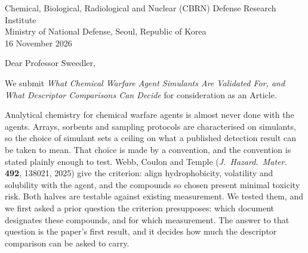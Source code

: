 \documentclass[11pt,a4paper]{article}
\begin{document}
{\small
Chemical, Biological, Radiological and Nuclear (CBRN) Defense Research Institute\\
Ministry of National Defense, Seoul, Republic of Korea\\
16 November 2026}

\vspace{6pt}

Dear Professor Sweedler,

We submit \textit{What Chemical Warfare Agent Simulants Are Validated For, and What Descriptor Comparisons Can Decide} for consideration as
an Article.

Analytical chemistry for chemical warfare agents is almost never done with the
agents. Arrays, sorbents and sampling protocols are characterised on simulants,
so the choice of simulant sets a ceiling on what a published detection result
can be taken to mean. That choice is made by a convention, and the convention is
stated plainly enough to test. Webb, Coulon and Temple (\textit{J.\ Hazard.\
Mater.} \textbf{492}, 138021, 2025) give the criterion:
align hydrophobicity, volatility and solubility with the agent, and the compounds
so chosen present minimal toxicity risk. Both halves are testable against
existing measurement. We tested them, and we first asked a prior question the
criterion presupposes: which document designates these compounds, and for
which measurement. The answer to that question is the paper's first result,
and it decides how much the descriptor comparison can be asked to carry.
\end{document}
